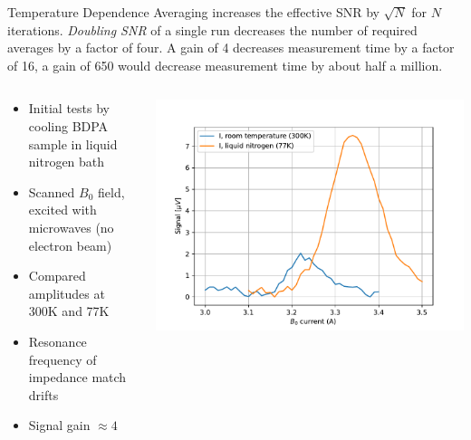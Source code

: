 \documentclass[final]{beamer}
\begin{document}
\begin{frame}[fragile]{}
\begin{columns}[T]
\begin{column}{.49\linewidth}
\begin{block}{\Large Temperature Dependence}
        Averaging increases the effective SNR by $\sqrt{N}$ for $N$ iterations. \textit{Doubling SNR}
        of a single run decreases the number of required averages by a factor of four. A gain
        of 4 decreases measurement time by a factor of 16, a gain of 650 would decrease
        measurement time by about half a million.

        \begin{columns}
          \begin{column}{0.65\columnwidth}
            \begin{itemize}
              \item Initial tests by cooling BDPA sample in liquid nitrogen bath
              \item Scanned $B_0$ field, excited with microwaves (no electron beam)
              \item Compared amplitudes at 300K and 77K
              \item Resonance frequency of impedance match drifts
              \item Signal gain $\approx 4$
            \end{itemize}
          \end{column}
          \begin{column}{0.35\columnwidth}
            \includegraphics[width=\columnwidth]{figures/signals300_77.pdf}
          \end{column}
        \end{columns}
      \end{block}


\end{column}
\end{columns}
\end{frame}
\end{document}
